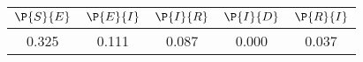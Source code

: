 \begin{tabular}{ccccc}
\hline
$\P{S}{E}$&$\P{E}{I}$&$\P{I}{R}$&$\P{I}{D}$&$\P{R}{I}$\\
\hline
0.325&0.111&0.087&0.000&0.037\\
\hline
\end{tabular}